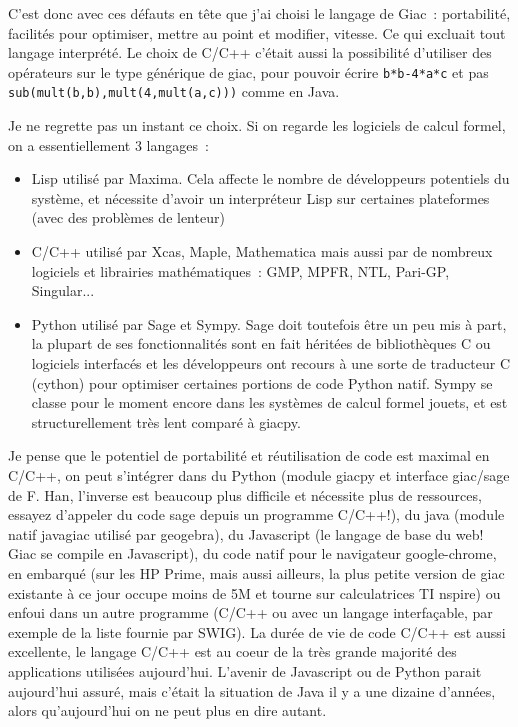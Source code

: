\documentclass[a4paper,11pt]{article}
\begin{document}
\begin{giacjshere}
C'est donc avec ces d\'efauts en t\^ete que j'ai choisi le
langage de Giac~: portabilit\'e, facilit\'es pour optimiser,
mettre au point et modifier, vitesse. Ce qui excluait
tout langage interpr\'et\'e. Le choix
de C/C++ c'\'etait aussi la possibilit\'e d'utiliser des op\'erateurs
sur le type g\'en\'erique de giac, pour pouvoir \'ecrire
\verb|b*b-4*a*c| et pas \verb|sub(mult(b,b),mult(4,mult(a,c)))|
comme en Java.

Je ne regrette pas un instant ce choix. Si on regarde les logiciels
de calcul formel, on a essentiellement 3 langages~:
\begin{itemize}
\item Lisp utilis\'e par Maxima. Cela affecte
le nombre de d\'eveloppeurs potentiels du syst\`eme,
et n\'ecessite d'avoir un interpr\'eteur Lisp sur
certaines plateformes (avec des probl\`emes de lenteur)
\item C/C++ utilis\'e par Xcas, Maple, Mathematica
mais aussi par de nombreux logiciels et librairies
math\'ematiques~: GMP, MPFR, NTL,
Pari-GP, Singular...
\item Python utilis\'e par Sage et Sympy. Sage doit toutefois
\^etre un peu mis \`a part, la plupart de ses fonctionnalit\'es
sont en fait h\'erit\'ees de biblioth\`eques C ou logiciels
interfac\'es et les d\'eveloppeurs ont recours \`a une
sorte de traducteur C (cython) pour optimiser certaines portions de code
Python natif. Sympy se classe pour le moment encore dans les
syst\`emes de calcul formel jouets,
et est structurellement tr\`es lent compar\'e \`a giacpy.
\end{itemize}
Je pense que le potentiel de portabilit\'e
et r\'eutilisation de code est maximal en C/C++,
on peut s'int\'egrer dans du Python (module giacpy
et interface giac/sage de F. Han, l'inverse est beaucoup plus difficile et
n\'ecessite plus de ressources, essayez d'appeler
du code sage depuis un programme C/C++!),
du java (module natif javagiac utilis\'e par geogebra),
du Javascript (le langage de base du web! Giac se compile en
Javascript),
du code natif pour le navigateur google-chrome,
en embarqu\'e (sur les HP Prime, mais aussi ailleurs,
la plus petite version de giac existante \`a ce jour
occupe moins de 5M et tourne sur calculatrices TI nspire) ou
enfoui dans un autre programme (C/C++ ou avec
un langage interfa\c{c}able, par exemple de la liste fournie par SWIG).
La dur\'ee de vie de code C/C++ est aussi excellente, le
langage C/C++ est au coeur de la tr\`es grande majorit\'e
des applications utilis\'ees aujourd'hui. L'avenir de Javascript
ou de Python parait aujourd'hui assur\'e, mais c'\'etait
la situation de Java il y a une dizaine d'ann\'ees, alors
qu'aujourd'hui on ne peut plus en dire autant.


\end{giacjshere}
\end{document}
